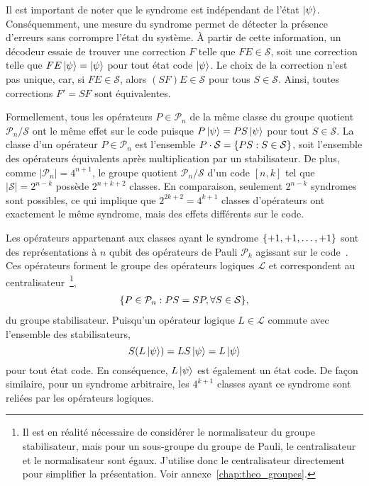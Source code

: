 Il est important de noter que le syndrome est indépendant de l'état $\ket \psi$.
Conséquemment,
une mesure du syndrome permet de détecter la présence d'erreurs sans corrompre l'état du système.
À partir de cette information,
un décodeur essaie de trouver une correction $F$ telle que $FE \in \mathcal S$, 
soit une correction telle que $FE\ket\psi = \ket\psi$ pour tout état code $\ket\psi$.
Le choix de la correction n'est pas unique, car, si $FE \in \mathcal S$,
alors $(SF)E \in \mathcal S$ pour tous $S \in \mathcal S$.
Ainsi,
toutes corrections $F' = SF$ sont équivalentes.

Formellement,
tous les opérateurs $P \in \mathcal P_n$ de la même classe du groupe quotient $\mathcal P_n/\mathcal S$
ont le même effet sur le code puisque $P\ket\psi = PS\ket\psi$ pour tout $S \in \mathcal S$.
La classe d'un opérateur $P \in \mathcal P_n$ est l'ensemble $P\cdot \mathcal S = \qty{PS : S\in \mathcal S}$,
soit l'ensemble des opérateurs équivalents après multiplication par un stabilisateur.
De plus,
comme $|\mathcal P_n| = 4^{n+1}$,
le groupe quotient $\mathcal P_n/\mathcal S$ d'un code $[n, k]$ tel que $|\mathcal S| = 2^{n - k}$
possède $2^{n+k+2}$ classes.
En comparaison,
seulement $2^{n-k}$ syndromes sont possibles,
ce qui implique que $2^{2k + 2} = 4^{k + 1}$ classes d'opérateurs ont exactement le même syndrome,
mais des effets différents sur le code.

Les opérateurs appartenant aux classes ayant le syndrome $\qty{+1, +1, \ldots, +1}$
sont des représentations à $n$ qubit des opérateurs de Pauli $\mathcal P_k$
agissant sur le code~\cite{aaronson_improved_2004}.
Ces opérateurs forment le groupe des opérateurs logiques $\mathcal L$ et correspondent
au centralisateur~\footnote{
  Il est en réalité nécessaire de considérer le normalisateur du groupe stabilisateur,
  mais pour un sous-groupe du groupe de Pauli,
  le centralisateur et le normalisateur sont égaux.
  J'utilise donc le centralisateur directement pour simplifier la présentation.
  Voir annexe~\ref{chap:theo_groupes}.
},
\begin{align}
  \qty{P \in \mathcal P_n : PS = SP, \forall S \in \mathcal S},
\end{align}
du groupe stabilisateur.
Puisqu'un opérateur logique $L \in \mathcal L$ commute avec l'ensemble des stabilisateurs,
\begin{equation}
  S(L\ket\psi) = LS\ket\psi = L\ket\psi
\end{equation}
pour tout état code.
En conséquence,
$L\ket\psi$ est également un état code.
De façon similaire,
pour un syndrome arbitraire,
les $4^{k+1}$ classes ayant ce syndrome sont reliées par les opérateurs logiques.

